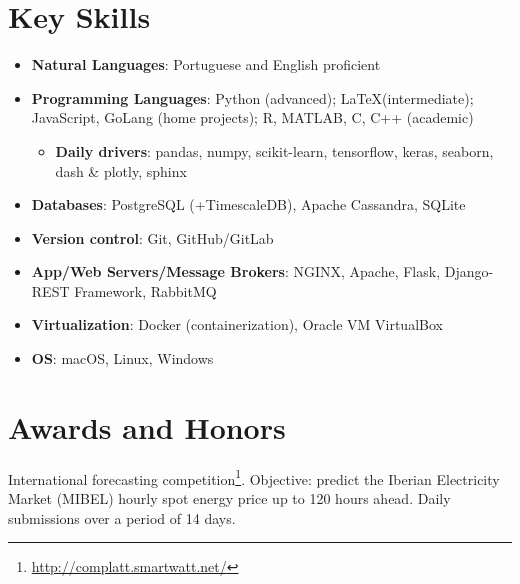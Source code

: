 \documentclass{mycv}
\begin{document}
\section{Key Skills}

\begin{itemize}[itemsep=5px]
	
	\item \textbf{Natural Languages}: Portuguese and English proficient
	
	\item \textbf{Programming Languages}: Python (advanced); \LaTeX (intermediate); JavaScript, GoLang (home projects); R, MATLAB, C, C++ (academic)
	
	\begin{itemize}
		\item \textbf{Daily drivers}: pandas, numpy, scikit-learn, tensorflow, keras, seaborn, dash \& plotly, sphinx
	\end{itemize}
	
	
	\item \textbf{Databases}: PostgreSQL (+TimescaleDB), Apache Cassandra, SQLite
	
	\item \textbf{Version control}: Git, GitHub/GitLab
	
	\item \textbf{App/Web Servers/Message Brokers}: NGINX, Apache, Flask, Django-REST Framework, RabbitMQ
	
	\item \textbf{Virtualization}: Docker (containerization), Oracle VM VirtualBox
	
	\item \textbf{OS}: macOS, Linux, Windows
	
	
\end{itemize}


\vspace{0.05cm}

\section{Awards and Honors}



International forecasting competition\footnote{\url{http://complatt.smartwatt.net/}}. Objective: predict the Iberian Electricity Market (MIBEL) hourly spot energy price up to 120 hours ahead. Daily submissions over a period of 14 days.
\end{document}
